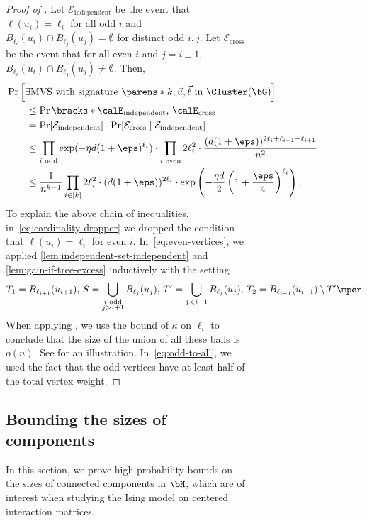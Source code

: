 \documentclass[11pt,letterpaper]{article}
\begin{document}
\begin{figure}
\begin{figure}
\begin{proof}[Proof of ]
        Let $\mathcal{E}_{\text{independent}}$ be the event that $\ell(u_i) = \ell_i$ for all odd $i$ and $B_{\ell_i}(u_i) \cap B_{\ell_j}(u_j) = \emptyset$ for distinct odd $i, j$. 
        Let $\mathcal{E}_{\text{cross}}$ be the event that for all even $i$ and $j = i\pm 1$, $B_{\ell_i}(u_i) \cap B_{\ell_{j}}(u_{j}) \ne \emptyset$. Then, 
        \begin{align}
            &\Pr\left[ \exists\text{MVS with signature }\parens*{k,\vec{u},\vec{\ell}} \text{ in }\Cluster(\bG) \right] \nonumber \\
            &\quad\quad \le \Pr\bracks*{\calE_{\text{independent}},\,\calE_{\text{cross}}} \label{eq:cardinality-dropper} \\
            &\quad\quad = \Pr[\mathcal{E}_{\text{independent}}] \cdot \Pr[\mathcal{E}_{\text{cross}} \mid \mathcal{E}_{\text{independent}}] \nonumber \\
            &\quad\quad \le \prod_{i \text{ odd}} \exp(-\eta d (1+\eps)^{\ell_i}) \cdot \prod_{i \text{ even}} 2\ell_i^2 \cdot \frac{(d(1+\eps))^{2\ell_i + \ell_{i-1} + \ell_{i+1}}}{n^2} \label{eq:even-vertices}\\
            &\quad\quad \le \frac{1}{n^{k-1}} \prod_{i \in [k]} 2\ell_i^2 \cdot (d(1+\eps))^{2\ell_i} \cdot \exp\left(-\frac{\eta d}{2} \left(1+\frac{\eps}{4}\right)^{\ell_i}\right) \label{eq:odd-to-all}.
        \end{align}
        To explain the above chain of inequalities, in~\eqref{eq:cardinality-dropper} we dropped the condition that $\ell(u_i) = \ell_i$ for even $i$.
        In~\eqref{eq:even-vertices}, we applied \cref{lem:independent-set-independent} and \cref{lem:gain-if-tree-excess} inductively with the setting
        \[
            T_1 = B_{\ell_{i+1}}(u_{i+1}),\, S = \bigcup_{\substack{i\text{ odd} \\ j > i+1}} B_{\ell_j}(u_j), \, T'=\bigcup_{j < i-1} B_{\ell_j}(u_j), \, T_2 = B_{\ell_{i-1}}(u_{i-1}) \setminus T'\mper
        \]
        When applying , we use the bound of $\kappa$ on $\ell_i$ to conclude that the size of the union of all these balls is $o(n)$.
        See  for an illustration. In~\eqref{eq:odd-to-all}, we used the fact that the odd vertices have at least half of the total vertex weight.
    \end{proof}

\subsection{Bounding the sizes of components}\label{sec:components-bound}
In this section, we prove high probability bounds on the sizes of connected components in $\bH$, which are of interest when studying the Ising model on  centered interaction matrices.


\end{figure}
\end{figure}
\end{document}
